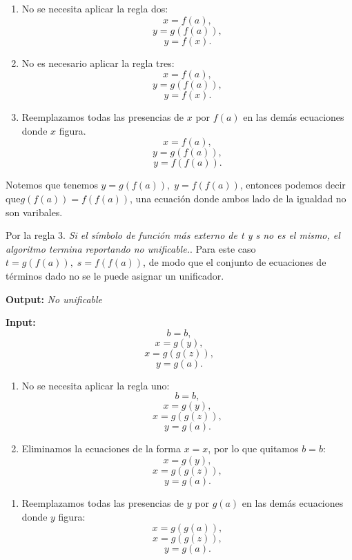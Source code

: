 \documentclass[12pt,letterpaper]{article}
\begin{document}
\begin{enumerate}
\begin{enumerate}[label=\arabic*)]
  \item \checkmark No se necesita aplicar la regla dos:
    \[
    x = f(a),
    \]
    \[
    y = g(f(a)),
    \]
    \[
    y = f(x).
    \]

  \item \checkmark No es necesario aplicar la regla tres:
    \[
    x = f(a),
    \]
    \[
    y = g(f(a)),
    \]
    \[
    y = f(x).
    \]

  \item Reemplazamos todas las presencias de $x$ por $f(a)$ en las dem\'{a}s ecuaciones donde $x$ figura.
    \[
    x = f(a),
    \]
    \[
    y = g(f(a)),
    \]
    \[
    y = f(f(a)).
    \]
  \end{enumerate}
  
  Notemos que tenemos $y = g(f(a)),\; y = f(f(a))$, entonces podemos decir que$ g(f(a)) = f(f(a))$, una ecuaci\'{o}n donde ambos lado de la igualdad no son varibales.

  Por la regla 3. \textit{Si el s\'{i}mbolo de funci\'{o}n m\'{a}s externo de t y s no es el mismo, el algoritmo termina reportando no unificable.}. Para este caso $t = g(f(a)),\; s = f(f(a))$, de modo que el conjunto de ecuaciones de t\'{e}rminos dado no se le puede asignar un unificador.
  
  \begin{center}
    \textbf{Output:} \textit{No unificable}
  \end{center}
 
  \textbf{Input:}
  \[
  b = b,
  \]
  \[
  x = g(y),
  \]
  \[
  x = g(g(z)),
  \]
  \[
  y = g(a).
  \]
  
  \begin{enumerate}[label=\arabic*)]
  \item \checkmark No se necesita aplicar la regla uno:
    \[
    b = b,
    \]
    \[
    x = g(y),
    \]
    \[
    x = g(g(z)),
    \]
    \[
    y = g(a).
    \]
    
  \item Eliminamos la ecuaciones de la forma \( x = x \), por lo que quitamos \( b = b \):
    \[
    x = g(y),
    \]
    \[
    x = g(g(z)),
    \]
    \[
    y = g(a).
    \]
  \end{enumerate}

  \begin{enumerate}[label=\arabic*), start=4]
  \item Reemplazamos todas las presencias de $y$ por $g(a)$ en las dem\'{a}s ecuaciones donde $y$ figura:
    \[
    x = g(g(a)),
    \]
    \[
    x = g(g(z)),
    \]
    \[
    y = g(a).
    \]
  \end{enumerate}


\end{enumerate}
\end{document}
